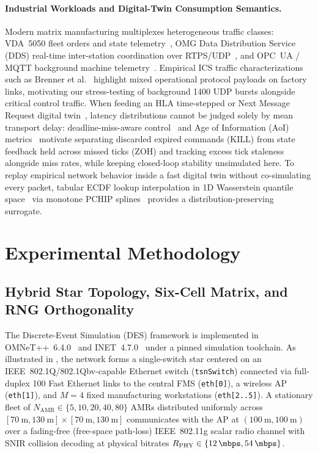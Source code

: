 \documentclass[11pt,a4paper]{article}
\newcommand{\Namr}{\ensuremath{N_{\mathrm{AMR}}}}
\newcommand{\Rphy}{\ensuremath{R_{\mathrm{PHY}}}}
\begin{document}
\paragraph{Industrial Workloads and Digital-Twin Consumption Semantics.}
Modern matrix manufacturing multiplexes heterogeneous traffic classes: VDA~5050 fleet orders and state telemetry~\cite{vda5050, 11511549}, OMG Data Distribution Service (DDS) real-time inter-station coordination over RTPS/UDP~\cite{omgdds, omgrtps, calvo2013dds}, and OPC~UA / MQTT background machine telemetry~\cite{opcua, mqtt5, profanter2019opcua, maia2020opcua}. Empirical ICS traffic characterizations such as Brenner et al.~\cite{brenner2024ics} highlight mixed operational protocol payloads on factory links, motivating our stress-testing of background \qty{1400}{\byte} UDP bursts alongside critical control traffic. When feeding an HLA time-stepped or Next Message Request digital twin~\cite{ieee1516}, latency distributions cannot be judged solely by mean transport delay: deadline-miss-aware control~\cite{pazzaglia2019dmac} and Age of Information (AoI) metrics~\cite{kaul2012real} motivate separating discarded expired commands (KILL) from state feedback held across missed ticks (ZOH) and tracking excess tick staleness alongside miss rates, while keeping closed-loop stability unsimulated here. To replay empirical network behavior inside a fast digital twin without co-simulating every packet, tabular ECDF lookup interpolation in 1D Wasserstein quantile space~\cite{panaretos2019wasserstein} via monotone PCHIP splines~\cite{fritsch1984pchip} provides a distribution-preserving surrogate.

\section{Experimental Methodology}
\label{sec:methodology}

\subsection{Hybrid Star Topology, Six-Cell Matrix, and RNG Orthogonality}
\label{sec:topology}

The Discrete-Event Simulation (DES) framework is implemented in OMNeT++~6.4.0~\cite{omnetpp, omnetpp640} and INET~4.7.0~\cite{inet} under a pinned simulation toolchain. As illustrated in , the network forms a single-switch star centered on an IEEE~802.1Q/802.1Qbv-capable Ethernet switch (\texttt{tsnSwitch}) connected via full-duplex \qty{100}{\mbps} Fast Ethernet links to the central FMS (\texttt{eth[0]}), a wireless AP (\texttt{eth[1]}), and $M=4$ fixed manufacturing workstations (\texttt{eth[2..5]}). A stationary fleet of $\Namr \in \{5, 10, 20, 40, 80\}$ AMRs distributed uniformly across $[\qty{70}{\meter}, \qty{130}{\meter}] \times [\qty{70}{\meter}, \qty{130}{\meter}]$ communicates with the AP at $(\qty{100}{\meter}, \qty{100}{\meter})$ over a fading-free (free-space path-loss) IEEE~802.11g scalar radio channel with SNIR collision decoding at physical bitrates $\Rphy \in \{\qty{12}{\mbps}, \qty{54}{\mbps}\}$.
\end{document}

